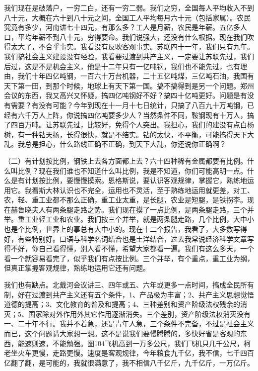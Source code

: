 我们现在是破落户，一穷二白，还有一穷二弱。我们之穷，全国每人平均收入不到八十元，大概在六十到八十元之间，全国工人平均每月六十元（包括家属）。农民究竟有多少，河南讲七十四元，有那么多？工人是月薪，农民是年薪。五亿多人口，平均年薪不到八十元，穷得要命。我们说强大，还没有什么根据。现在我们吹得太大了，不合乎事实。我看没有反映客观事实。苏联四十一年，我们只有九年。我们搞社会主义建设没有经验，我看要过渡到共产主义，一定要让苏联先过，我们后过，这是不是机会主义，他是十二年只有一亿吨钢，我们也不能先过，也有理由，我们十年四亿吨钢，一百六十万台机器，二十五亿吨煤，三亿吨石油，我国有天下第一田，到那个时候，地球上有天下第一国。搞不搞得到是另一个问题。郑州会议的东西，我又高兴又怀疑，搞四亿吨钢好不好？搞四十亿吨更好。问题是有没有需要？有没有可能？今年到现在十一月十七日统计，只搞了八百九十万吨钢，已经有六千万人上阵，你说搞四亿吨要多少人？当然条件不同，鞍钢现有十万人，搞了四百万吨。让苏联先过，比较好，免得个人突出。我担心，我们的建没有点白杨树，有一种钻天扬，长得很快，就是不结实。钻的太快，不平衡，可能搞得天下大乱。我总是担心，什么路线正确不正确，到天下大乱，你还说你正确啊？

（二）有计划按比例，钢铁上去各方面都上去？六十四种稀有金属都要有比例。什么叫比例？现在我们谁也不知道什么叫比例，我是不知道，你们可能高明一点。什么是有计划按比例，要慢慢摸索。恩格斯说，要认识客观规律，掌握它，熟练地运用它。我看斯大林认识也不完全，运用也不灵活，至于熟练地运用就更差，对工、农，轻、重工业都不那么正确，重工业太重，是长腿，农业是短腿，是铁拐李。现在赫鲁晓夫人有两条腿走路之势。我们现在摸了一点比例，是两条腿走路，三个并举。重工业轻工业和农业。我们按三个并举，就是两条腿走路，几个比例，大中小也是个比例，世界上的事总有大中小的。现在十二个报告，我看了，大多数写得好，有些特别好。口语与科学名词结合也是土洋结合，过去我常说经济科学文章写得不好，你自己看得懂，别人看不懂，希望大家都看一遍。我们有这么多天，一个看一个就容易看完了，似乎我们有点按比例。三个并举，有个重点，重工业为纲，但真正掌握客观规律，熟练地运用它还有问题。

我们也有缺点。北戴河会议讲三、四年或五、六年或更多一点时间，搞成全民所有制，好在过渡到共产主义还有五个条件，1、产品极为丰富；2、共产主义思想觉悟道德的提高；3、文化教育的普及和提高；4、三种差别和资产阶级法权残余的消灭；5、国家除对外作用外其它作用逐渐消失。三个差别，资产阶级法权消灭没有一、二十年不行。我并不着急，还是青年人急，三个条件不完备，不过是社会主义而已，这个问题请大家想一想。这不是说我们要慢腾腾的，多快好省是客观的东西，能速则速，不能勉强。图104飞机高到一万多公尺，我们飞机只几千公尺，柯老坐火车更慢，走路更慢。速度是客观规律，今年粮食九千亿，我不信，七千四百亿翻了翻，是可能的，我就很满意了，我不相信八千亿斤，九千亿斤，一万亿斤。

